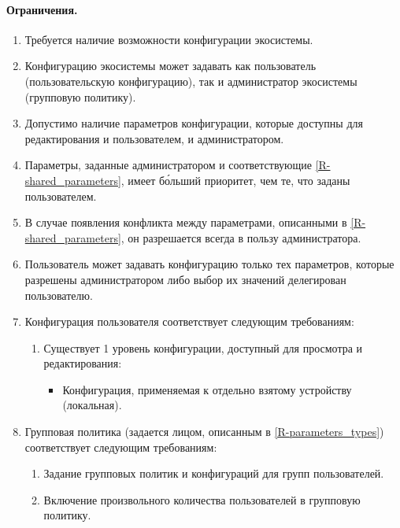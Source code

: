 \paragraph{Ограничения.}
\begin{enumerate}[label={\bfseries О-\arabic*.}]
   \item Требуется наличие возможности конфигурации экосистемы.
   \item Конфигурацию экосистемы может задавать как пользователь (пользовательскую конфигурацию), так и администратор экосистемы (групповую политику).
   \item Допустимо наличие параметров конфигурации, которые доступны для редактирования и пользователем, и администратором.
         \label{R-shared_parameters}
   \item Параметры, заданные администратором и соответствующие \ref{R-shared_parameters}, имеет б\'{о}льший приоритет, чем те, что заданы пользователем.
         \label{R-parameters_types}
   \item В случае появления конфликта между параметрами, описанными в \ref{R-shared_parameters}, он разрешается всегда в пользу администратора.
   \item Пользователь может задавать конфигурацию только тех параметров, которые разрешены администратором либо выбор их значений делегирован пользователю.
   \item Конфигурация пользователя соответствует следующим требованиям:
         \begin{enumerate}[nosep,label*={\bfseries\arabic*.}]
            \item Существует 1 уровень конфигурации, доступный для просмотра и редактирования:
                  \begin{itemize}[label=---]
                     \item Конфигурация, применяемая к отдельно взятому устройству (локальная).
                           \label{UR-config_levels}
                  \end{itemize}
         \end{enumerate}
   \item Групповая политика (задается лицом, описанным в \ref{R-parameters_types}) соответствует следующим требованиям:
         \begin{enumerate}[nosep,label*={\bfseries\arabic*.}]
            \item Задание групповых политик и конфигураций для групп пользователей.
            \item Включение произвольного количества пользователей в групповую политику.

\end{enumerate}
\end{enumerate}
